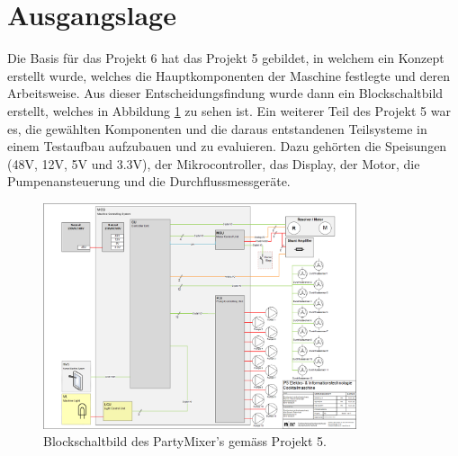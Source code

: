 \section{Ausgangslage}
\label{sec:Ausgangslage}

Die Basis für das Projekt 6 hat das Projekt 5 gebildet, in welchem ein Konzept erstellt wurde, welches die Hauptkomponenten der Maschine festlegte und deren Arbeitsweise. Aus dieser Entscheidungsfindung wurde dann ein Blockschaltbild erstellt, welches in Abbildung \ref{fig:P5_Blockschaltbild_Partymixer} zu sehen ist. Ein weiterer Teil des Projekt 5 war es, die gewählten Komponenten und die daraus entstandenen Teilsysteme in einem Testaufbau aufzubauen und zu evaluieren. Dazu gehörten die Speisungen (48V, 12V, 5V und 3.3V), der Mikrocontroller, das Display, der Motor, die Pumpenansteuerung und die Durchflussmessgeräte.

\begin{figure}[H]
\center
\includegraphics[angle=90, width = 0.82\textwidth]{graphics/P5-Blockschema}
\caption{Blockschaltbild des PartyMixer's gemäss Projekt 5.}
\label{fig:P5_Blockschaltbild_Partymixer}
\end{figure}

\newpage

